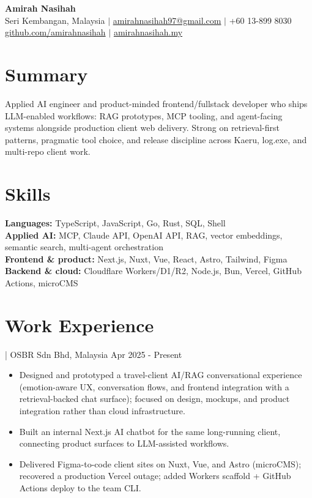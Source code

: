 \documentclass[11pt]{article}
\newcommand{\job}[4]{%
  \vspace{2pt}{\bfseries #1} | #2#3 \hfill #4\par}
\begin{document}
\begin{center}
{\LARGE\bfseries Amirah Nasihah}\\[3pt]
Seri Kembangan, Malaysia $\vert$
\href{mailto:amirahnasihah97@gmail.com}{amirahnasihah97@gmail.com} $\vert$
+60 13-899 8030\\[1pt]
\href{https://github.com/amirahnasihah}{github.com/amirahnasihah} $\vert$
\href{https://amirahnasihah.my}{amirahnasihah.my}
\end{center}

\section{Summary}
Applied AI engineer and product-minded frontend/fullstack developer who ships
LLM-enabled workflows: RAG prototypes, MCP tooling, and agent-facing systems
alongside production client web delivery. Strong on retrieval-first patterns,
pragmatic tool choice, and release discipline across Kaeru, log.exe, and
multi-repo client work.

\section{Skills}
\textbf{Languages:} TypeScript, JavaScript, Go, Rust, SQL, Shell\\
\textbf{Applied AI:} MCP, Claude API, OpenAI API, RAG, vector embeddings,
semantic search, multi-agent orchestration\\
\textbf{Frontend \& product:} Next.js, Nuxt, Vue, React, Astro, Tailwind, Figma\\
\textbf{Backend \& cloud:} Cloudflare Workers/D1/R2, Node.js, Bun, Vercel,
GitHub Actions, microCMS

\section{Work Experience}

\job{Jr. Frontend Developer}{OSBR Sdn Bhd}{, Malaysia}{Apr 2025 - Present}
\begin{itemize}
  \item Designed and prototyped a travel-client AI/RAG conversational experience
        (emotion-aware UX, conversation flows, and frontend integration with a
        retrieval-backed chat surface); focused on design, mockups, and product
        integration rather than cloud infrastructure.
  \item Built an internal Next.js AI chatbot for the same long-running client,
        connecting product surfaces to LLM-assisted workflows.
  \item Delivered Figma-to-code client sites on Nuxt, Vue, and Astro (microCMS);
        recovered a production Vercel outage; added Workers scaffold + GitHub
        Actions deploy to the team CLI.
\end{itemize}
\end{document}
